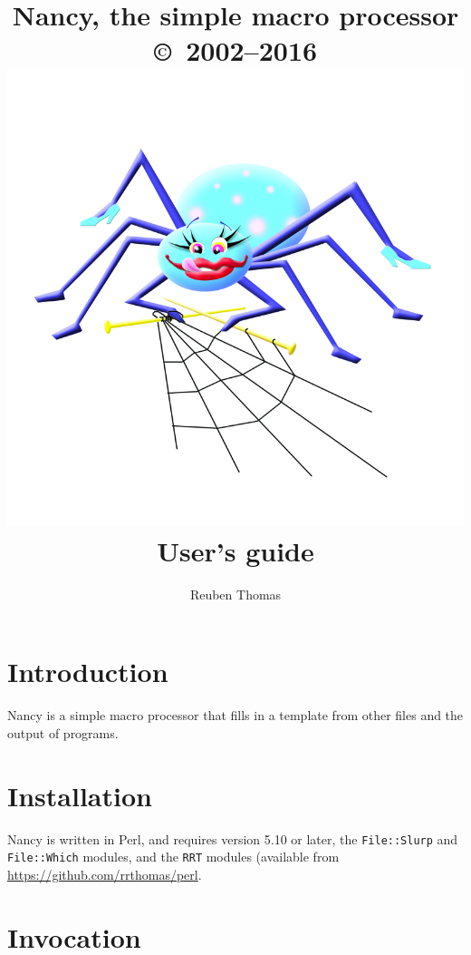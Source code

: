 \documentclass[a4paper,english]{scrartcl}
\begin{document}
\title{Nancy, the simple macro processor\\{\large\copyright\ 2002--2016}\\\includegraphics[scale=0.45]{logo/nancy.png}
\\User’s guide}
\author{Reuben Thomas}
\maketitle

\section{Introduction}

Nancy is a simple macro processor that fills in a template from other files and the output of programs.

\section{Installation}

Nancy is written in Perl, and requires version 5.10 or later, the \verb|File::Slurp| and \verb|File::Which| modules, and the \verb|RRT| modules (available from \url{https://github.com/rrthomas/perl}.

\section{Invocation}
\end{document}
